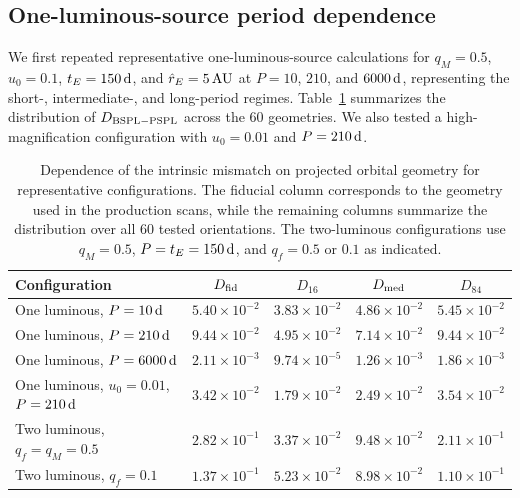 \documentclass{article}
\begin{document}
\subsection{One-luminous-source period dependence}

We first repeated representative one-luminous-source calculations for
$q_M=0.5$, $u_0=0.1$, $t_E=150\,{\rm d}$, and
$\hat r_E=5\,{\rm AU}$ at $P=10$, $210$, and $6000\,{\rm d}$,
representing the short-, intermediate-, and long-period regimes.
Table~\ref{tab:geometry_broad} summarizes the distribution of
$D_{\rm BSPL-PSPL}$ across the 60 geometries. We also tested a
high-magnification configuration with $u_0=0.01$ and $P=210\,{\rm d}$.

\begin{table}[H]
\centering
\caption{
Dependence of the intrinsic mismatch on projected orbital geometry for
representative configurations. The fiducial column corresponds to the
geometry used in the production scans, while the remaining columns
summarize the distribution over all 60 tested orientations. The
two-luminous configurations use $q_M=0.5$, $P=t_E=150\,{\rm d}$, and
$q_f=0.5$ or $0.1$ as indicated.
}
\label{tab:geometry_broad}
\begin{tabular}{lcccc}
\toprule
Configuration &
$D_{\rm fid}$ &
$D_{16}$ &
$D_{\rm med}$ &
$D_{84}$ \\
\midrule
One luminous, $P=10\,{\rm d}$ &
$5.40\times10^{-2}$ &
$3.83\times10^{-2}$ &
$4.86\times10^{-2}$ &
$5.45\times10^{-2}$ \\
One luminous, $P=210\,{\rm d}$ &
$9.44\times10^{-2}$ &
$4.95\times10^{-2}$ &
$7.14\times10^{-2}$ &
$9.44\times10^{-2}$ \\
One luminous, $P=6000\,{\rm d}$ &
$2.11\times10^{-3}$ &
$9.74\times10^{-5}$ &
$1.26\times10^{-3}$ &
$1.86\times10^{-3}$ \\
One luminous, $u_0=0.01$, $P=210\,{\rm d}$ &
$3.42\times10^{-2}$ &
$1.79\times10^{-2}$ &
$2.49\times10^{-2}$ &
$3.54\times10^{-2}$ \\
Two luminous, $q_f=q_M=0.5$ &
$2.82\times10^{-1}$ &
$3.37\times10^{-2}$ &
$9.48\times10^{-2}$ &
$2.11\times10^{-1}$ \\
Two luminous, $q_f=0.1$ &
$1.37\times10^{-1}$ &
$5.23\times10^{-2}$ &
$8.98\times10^{-2}$ &
$1.10\times10^{-1}$ \\
\bottomrule
\end{tabular}
\end{table}
\end{document}
